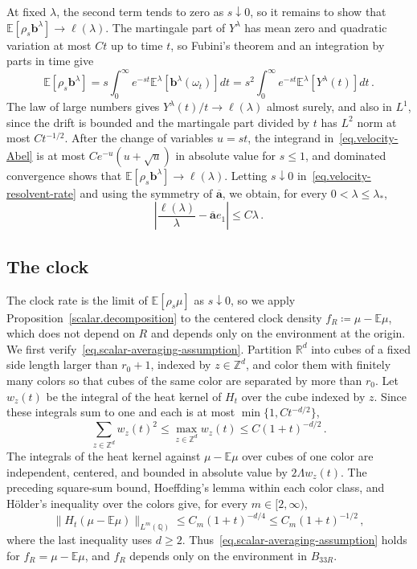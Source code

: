 \documentclass[11pt]{amsart}
\theoremstyle{definition}
\theoremstyle{remark}
\numberwithin{equation}{section}
\newcommand{\E}{\mathbb E}
\newcommand{\Q}{\mathbb Q}
\newcommand{\R}{\mathbb R}
\newcommand{\Zd}{\mathbb Z^d}
\renewcommand{\b}{\mathbf b}
\newcommand{\ahom}{\overline{\mathbf a}}
\begin{document}
At fixed $\lambda$, the second term tends to zero as $s\downarrow0$, so it remains to show that $\E[\rho_s\b^\lambda]\to\ell(\lambda)$. The martingale part of $Y^\lambda$ has mean zero and quadratic variation at most $Ct$ up to time $t$, so Fubini's theorem and an integration by parts in time give
\begin{equation}\label{eq.velocity-Abel}
 \E[\rho_s\b^\lambda]
 =s\int_0^\infty e^{-st}\mathbb E^\lambda[\b^\lambda(\omega_t)]dt
 =s^2\int_0^\infty e^{-st}\mathbb E^\lambda[Y^\lambda(t)]dt\, .
\end{equation}
The law of large numbers gives $Y^\lambda(t)/t\to\ell(\lambda)$ almost surely, and also in $L^1$, since the drift is bounded and the martingale part divided by $t$ has $L^2$ norm at most $Ct^{-1/2}$. After the change of variables $u=st$, the integrand in~\eqref{eq.velocity-Abel} is at most $Ce^{-u}(u+\sqrt u)$ in absolute value for $s\leq1$, and dominated convergence shows that $\E[\rho_s\b^\lambda]\to\ell(\lambda)$. Letting $s\downarrow0$ in~\eqref{eq.velocity-resolvent-rate} and using the symmetry of $\ahom$, we obtain, for every $0<\lambda\leq\lambda_*$,
\begin{equation}\label{eq.reduced-velocity-rate}
 \left|\frac{\ell(\lambda)}\lambda-\ahom e_1\right|\leq C\lambda\, .
\end{equation}

\subsection{The clock}\label{ss.clock}

The clock rate is the limit of $\E[\rho_s\mu]$ as $s\downarrow0$, so we apply Proposition~\ref{scalar.decomposition} to the centered clock density $f_R\coloneqq\mu-\E\mu$, which does not depend on $R$ and depends only on the environment at the origin. We first verify~\eqref{eq.scalar-averaging-assumption}. Partition $\R^d$ into cubes of a fixed side length larger than $r_0+1$, indexed by $z\in\Zd$, and color them with finitely many colors so that cubes of the same color are separated by more than $r_0$. Let $w_z(t)$ be the integral of the heat kernel of $H_t$ over the cube indexed by $z$. Since these integrals sum to one and each is at most $\min\{1,Ct^{-d/2}\}$,
\begin{equation*}
 \sum_{z\in\Zd} w_z(t)^2\leq\max_{z\in\Zd} w_z(t)\leq C(1+t)^{-d/2}\, .
\end{equation*}
The integrals of the heat kernel against $\mu-\E\mu$ over cubes of one color are independent, centered, and bounded in absolute value by $2\Lambda w_z(t)$. The preceding square-sum bound, Hoeffding's lemma within each color class, and H\"older's inequality over the colors give, for every $m\in[2,\infty)$,
\begin{equation}\label{eq.clock-spatial-averages}
 \|H_t(\mu-\E\mu)\|_{L^m(\Q)}\leq C_m(1+t)^{-d/4}\leq C_m(1+t)^{-1/2}\, ,
\end{equation}
where the last inequality uses $d\geq2$. Thus~\eqref{eq.scalar-averaging-assumption} holds for $f_R=\mu-\E\mu$, and $f_R$ depends only on the environment in $B_{33R}$.
\end{document}

